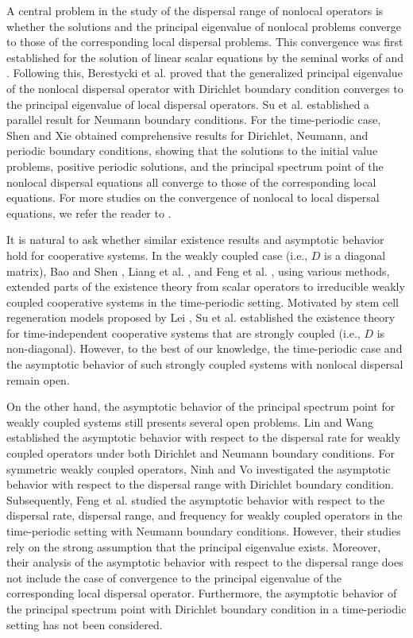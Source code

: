 \documentclass[11pt,reqno]{amsart}
\numberwithin{equation}{section}
\begin{document}
A central problem in the study of the dispersal range of nonlocal operators is whether the solutions and the principal eigenvalue of nonlocal problems converge to those of the corresponding local dispersal problems.
This convergence was first established for the solution of linear scalar equations by the seminal works of
\cite{CER} and \cite{CERW}.
Following this, Berestycki et al. \cite{BCV1} proved that the generalized principal eigenvalue of the nonlocal dispersal operator with Dirichlet boundary condition converges to the principal eigenvalue of local dispersal operators.
Su et al. \cite{SLY} established a parallel result for Neumann boundary conditions.
For the time-periodic case, Shen and Xie \cite{SX} obtained comprehensive results for Dirichlet, Neumann, and periodic boundary conditions, showing that the solutions to the initial value problems, positive periodic solutions, and the principal spectrum point of the nonlocal dispersal equations all converge to those of the corresponding local equations.
For more studies on the convergence of nonlocal to local dispersal equations, we refer the reader to \cite{KR2,DN,SS,SunVo}.


It is natural to ask whether similar existence results and asymptotic behavior hold for cooperative systems.
In the weakly coupled case (i.e., $D$ is a diagonal matrix), Bao and Shen \cite{BSS17}, Liang et al. \cite{LZZ}, and Feng et al. \cite{Feng}, using various methods, extended parts of the existence theory from scalar operators to irreducible weakly coupled cooperative systems in the time-periodic setting.
Motivated by stem cell regeneration models proposed by Lei \cite{Lei1, Lei2}, Su et al. \cite{SLLW, SWZ} established the existence theory for time-independent cooperative systems that are strongly coupled (i.e., $D$ is non-diagonal).
However, to the best of our knowledge, the time-periodic case and the asymptotic behavior of such strongly coupled systems with nonlocal dispersal remain open.


On the other hand, the asymptotic behavior of the principal spectrum point for weakly coupled systems still presents several open problems.
Lin and Wang \cite{LinWang}  established the asymptotic behavior with respect to the dispersal rate for weakly coupled operators under both Dirichlet and Neumann boundary conditions.
For symmetric weakly coupled operators, Ninh and Vo \cite{NV2} investigated the asymptotic behavior with respect to the dispersal range with Dirichlet boundary condition.
Subsequently, Feng et al.\cite{Feng} studied the asymptotic behavior with respect to the dispersal rate, dispersal range, and frequency for weakly coupled operators in the time-periodic setting with Neumann boundary conditions.
However, their studies \cite{NV2,Feng} rely on the strong assumption that the principal eigenvalue exists.
Moreover, their analysis of the asymptotic behavior with respect to the dispersal range does not include the case of convergence to the principal eigenvalue of the corresponding local dispersal operator.
Furthermore, the asymptotic behavior of the principal spectrum point with Dirichlet boundary condition in a time-periodic setting has not been considered.
\end{document}

